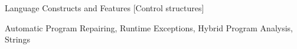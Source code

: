 \documentclass[pldi]{sigplanconf}
\begin{document}
\begin{abstract}


\end{abstract}

% 
{Language Constructs and Features}
[Control structures]

\keywords
Automatic Program Repairing, Runtime Exceptions,  Hybrid Program Analysis, Strings














\raggedright
\small


\end{document}
